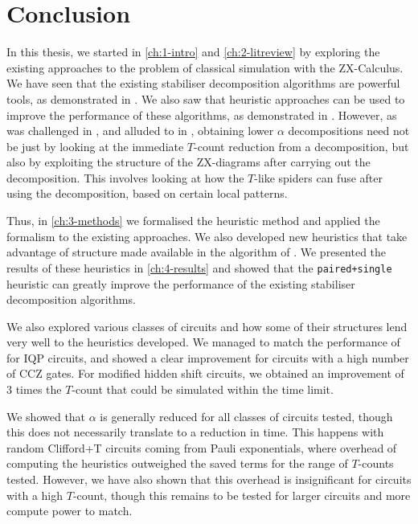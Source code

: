 \chapter{\label{ch:5-conclusion}Conclusion}

In this thesis, we started in \autoref{ch:1-intro} and \ref{ch:2-litreview} 
by exploring the existing approaches to the problem of classical simulation with the ZX-Calculus.
We have seen that the existing stabiliser decomposition algorithms are powerful tools,
as demonstrated in \cite{Kissinger2022cat}.
We also saw that heuristic approaches can be used to improve the performance of these algorithms,
as demonstrated in \cite{sutcliffe2024proccut,Codsi2022}.
However, as was challenged in \cite{sutcliffe2024proccut}, and alluded to in \cite{Codsi2022},
obtaining lower $\alpha$ decompositions need not be just by looking at the immediate $T$-count reduction
from a decomposition, but also by exploiting the structure of the ZX-diagrams 
after carrying out the decomposition.
This involves looking at how the $T$-like spiders can fuse after using the \CutRule decomposition,
based on certain local patterns.

Thus, in \autoref{ch:3-methods} we formalised the heuristic method and applied the formalism 
to the existing approaches.
We also developed new heuristics that take advantage of structure made available in
the  algorithm of \cite{Duncan2020graphtheoretic}.
We presented the results of these heuristics in \autoref{ch:4-results} and showed that 
the \texttt{paired+single} heuristic can greatly improve 
the performance of the existing stabiliser decomposition algorithms.

We also explored various classes of circuits and how some of their structures
lend very well to the heuristics developed.
We managed to match the performance of \cite{codsi2023} for IQP circuits,
and showed a clear improvement for circuits with a high number of CCZ gates.
For modified hidden shift circuits, we obtained an improvement of 3 times the $T$-count
that could be simulated within the time limit.

We showed that $\alpha$ is generally reduced for all classes of circuits tested,
though this does not necessarily translate to a reduction in time.
This happens with random Clifford+T circuits coming from Pauli exponentials,
where overhead of computing the heuristics outweighed the saved terms for the range of $T$-counts tested.
However, we have also shown that this overhead is insignificant for circuits with a high $T$-count,
though this remains to be tested for larger circuits and more compute power to match.

